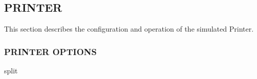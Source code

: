 \subsection[Printer]{PRINTER}

This section describes the configuration and operation of the simulated Printer.

\subsubsection[Printer Options]{PRINTER OPTIONS}

split
